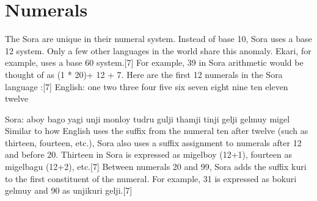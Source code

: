 \section{Numerals}\label{s:munda}

The Sora are unique in their numeral system. Instead of base 10, Sora uses a base 12 system. Only a few other languages in the world share this anomaly. Ekari, for example, uses a base 60 system.[7] For example, 39 in Sora arithmetic would be thought of as (1 * 20)+ 12 + 7. Here are the first 12 numerals in the Sora language :[7]
English: one two three four five six seven eight nine ten eleven twelve

Sora: aboy bago yagi unji monloy tudru gulji thamji tinji gelji gelmuy migel
Similar to how English uses the suffix from the numeral ten after twelve (such as thirteen, fourteen, etc.), Sora also uses a suffix assignment to numerals after 12 and before 20. Thirteen in Sora is expressed as migelboy (12+1), fourteen as migelbagu (12+2), etc.[7] Between numerals 20 and 99, Sora adds the suffix kuri to the first constituent of the numeral. For example, 31 is expressed as bokuri gelmuy and 90 as unjikuri gelji.[7]
